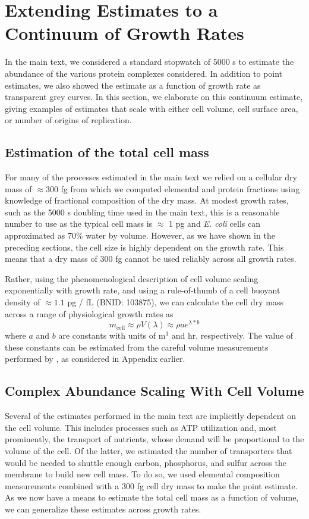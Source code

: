 \section{Extending Estimates to a Continuum of Growth Rates}
\label{sec:SI_continuum_est}
In the main text, we considered a standard stopwatch of 5000 s to estimate the
abundance of the various protein complexes considered. In addition to point
estimates, we also showed the estimate as a function of growth rate as
transparent grey curves. In this section, we elaborate on this continuum
estimate, giving examples of estimates that scale with either cell volume, cell
surface area, or number of origins of replication.

\subsection{Estimation of the total cell mass}
For many of the processes estimated in the main text we relied on a cellular dry
mass of $\approx 300$ fg from which we computed elemental and protein fractions
using knowledge of fractional composition of the dry mass. At modest growth
rates, such as the 5000 s doubling time used in the main text, this is a
reasonable number to use as the typical cell mass is $\approx$ 1 pg and
\textit{E. coli} cells can approximated as 70\% water by volume. However, as we
have shown in the preceding sections, the cell size is highly dependent on the growth rate. This means that a dry mass of 300
fg cannot be used reliably across all growth rates.

Rather, using the phenomenological  description of cell volume scaling
exponentially with growth rate, and using a rule-of-thumb of a cell buoyant
density of $\approx 1.1$ pg / fL (BNID: 103875), we can calculate the cell dry mass across a
range of physiological growth rates as
\begin{equation}
    m_\text{cell} \approx \rho V(\lambda) \approx \rho ae^{\lambda * b}
    \label{eq:def_mcell}
\end{equation}
where $a$ and $b$ are constants with units of \textmu m$^3$  and hr,
respectively. The value of these constants can be estimated from the careful
volume measurements performed by \cite{si2017, si2017}, as considered in Appendix  earlier.

\subsection{Complex Abundance Scaling With Cell Volume}
Several of the estimates performed in the main text are implicitly dependent
on the cell volume. This includes processes such as ATP utilization and, most
prominently, the transport of nutrients, whose demand will be proportional to the volume
of the cell. Of the latter, we estimated the
number of transporters that would be needed to shuttle enough carbon,
phosphorus, and sulfur across the membrane to build new cell mass. To do so,
we used elemental composition measurements combined with a 300 fg cell dry
mass to make the point estimate. As we now have a means to estimate the total
cell mass as a function of volume, we can generalize these estimates across
growth rates.


